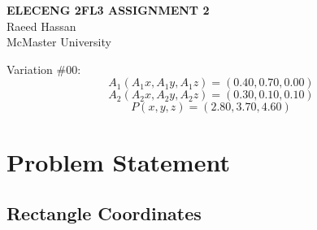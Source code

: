 \documentclass[12pt]{article}
\begin{document}
\begin{center}
    \textbf{\Large{ELECENG 2FL3 ASSIGNMENT 2}} \\
    \vspace{2mm}
    \large{Raeed Hassan} \\
    McMaster University
\end{center}
\hrulefill

Variation \#00:
$$ A_1(A_1x,A_1y,A_1z) = (0.40,0.70,0.00) $$
$$ A_2(A_2x,A_2y,A_2z) = (0.30,0.10,0.10) $$
$$ P(x,y,z) = (2.80,3.70,4.60) $$
\section{Problem Statement}

\subsection{Rectangle Coordinates}
\end{document}
